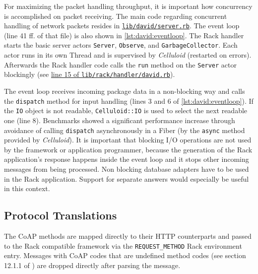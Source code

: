 		For maximizing the packet handling throughput, it is important how
		concurrency is accomplished on packet receiving. The main code
		regarding concurrent handling of network packets resides in
		\href{https://github.com/nning/david/blob/0.4.3/lib/david/server.rb}{\texttt{lib/david/server.rb}}.
		The event loop (line 41 ff. of that file) is also shown in
		\autoref{lst:david:eventloop}. The Rack handler starts the basic server
		actors \texttt{Server}, \texttt{Observe}, and
		\texttt{GarbageCollector}. Each actor runs in its own Thread and is
		supervised by \emph{Celluloid} (restarted on errors).  Afterwards the
		Rack handler code calls the \texttt{run} method on the \texttt{Server}
		actor blockingly (see
		\href{https://github.com/nning/david/blob/0.4.3/lib/rack/handler/david.rb#L15}{line
		15 of \texttt{lib/rack/handler/david.rb}}).
		
		The event loop receives incoming package data in a non-blocking way and
		calls the \texttt{dispatch} method for input handling (lines 3 and 6 of
		\autoref{lst:david:eventloop}). If the \texttt{IO} object is not
		readable, \texttt{Celluloid::IO} is used to select the next readable
		one (line 8). Benchmarks showed a significant performance increase
		through avoidance of calling \texttt{dispatch} asynchronously in a
		Fiber (by the \texttt{async} method provided by \emph{Celluloid}). It
		is important that blocking I/O operations are not used by the framework
		or application programmer, because the generation of the Rack
		application's response happens inside the event loop and it stops other
		incoming messages from being processed. Non blocking database adapters
		have to be used in the Rack application. Support for separate answers
		would especially be useful in this context.
			
	\subsection{Protocol Translations}
		
		The \ac{CoAP} methods are mapped directly to their \ac{HTTP}
		counterparts and passed to the Rack compatible framework via the
		\texttt{REQUEST\_METHOD} Rack environment entry. Messages with
		\ac{CoAP} codes that are undefined method codes (see section 12.1.1 of
		\cite{coap}) are dropped directly after parsing the message.

